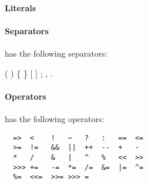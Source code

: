 \paragraph{Literals}


\paragraph{Separators}
\Xten{} has the following separators:
\begin{x10}
(	)	\{	\}	[	
]	;	,	.
\end{x10}

\paragraph{Operators}
\Xten{} has the following operators:
{\footnotesize
\begin{verbatim}
  =>  <    !   ~   ?   :   ==  <=  
  >=  !=   &&  ||  ++  --  +   - 
  *   /    &   |   ^   %   <<  >> 
  >>> +=   -=  *=  /=  &=  |=  ^=  
  %=  <<=  >>= >>> =
\end{verbatim}}




